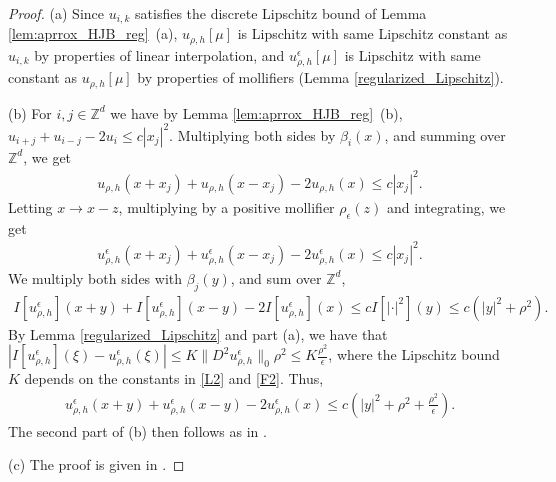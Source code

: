\documentclass[a4paper,  twoside, 10pt, leqno]{amsart}
\theoremstyle{remark}
\theoremstyle{definition}
\begin{document}
\begin{proof}
    \noindent   (a) Since $u_{i,k}$ satisfies the discrete Lipschitz bound of Lemma \ref{lem:aprrox_HJB_reg}~(a), $u_{\rho,h} [ \mu ]$ is Lipschitz with same Lipschitz constant as  $u_{i,k}$ by properties of linear interpolation, and $u_{\rho,h}^{\epsilon} [ \mu ]$ is Lipschitz with same constant as $u_{\rho,h} [ \mu ]$ by properties of mollifiers (Lemma \ref{regularized_Lipschitz}).
     
    \medskip

 \noindent (b)  For $i,j \in  \mathbb{Z}^{d}$ we have by Lemma \ref{lem:aprrox_HJB_reg}~(b),  $u_{i+j} + u_{i-j} - 2 u_{i} \leq c |x_{j}|^{2}.$
 Multiplying both sides by $\beta_{i} ( x )$, and summing over $\mathbb{Z}^{d}$, we get
 \begin{align*}
     u_{\rho,h} ( x + x_{j} ) + u_{\rho,h} ( x-x_{j} ) -2 u_{\rho,h} ( x ) \leq c |x_{j}|^{2}.
 \end{align*}
 Letting $x \to x - z$, multiplying by a positive mollifier $\rho_{\epsilon} ( z )$ and integrating, we get
 \begin{align*}
     u_{\rho,h}^{\epsilon} ( x + x_{j} ) + u_{\rho,h}^{\epsilon} ( x-x_{j} ) -2 u_{\rho,h}^{\epsilon} ( x ) \leq c |x_{j}|^{2}.
 \end{align*}
 We multiply both sides with $\beta_{j} ( y )$, and sum over $\mathbb{Z}^{d}$,
 \begin{align*}
     I [ u_{\rho,h}^{\epsilon} ] ( x+y ) + I [ u_{\rho,h}^{\epsilon} ] ( x-y ) - 2 I [ u_{\rho,h}^{\epsilon} ] ( x ) \leq c I [ |\cdot|^{2} ] ( y ) \leq  c (  |y|^{2} + \rho^{2} ).
 \end{align*}
By Lemma \ref{regularized_Lipschitz} and part (a), we have that $|I [ u_{\rho,h}^{\epsilon} ] ( \xi ) - u_{\rho,h}^{\epsilon} ( \xi )|\leq  K \| D^{2} u_{\rho,h}^{\epsilon}  \|_{0} \rho^{2} \leq  K \frac{\rho^{2}}{\epsilon}$,  where the Lipschitz bound  $K$ depends on the constants in \ref{L2} and \ref{F2}. Thus,
 \begin{align*}
      u_{\rho,h}^{\epsilon}  ( x+y ) + u_{\rho,h}^{\epsilon}  ( x-y ) - 2 u_{\rho,h}^{\epsilon}  ( x ) \leq  c (  |y|^{2} + \rho^{2} + \frac{\rho^{2}}{\epsilon} ).
 \end{align*}
 The second part of (b) then follows as in  \cite[Remark 6]{achdou2014numerical}.\medskip

 \noindent (c) The proof is given in \cite[Lemma 3.6]{carliniSilva2014semi1st}.
\end{proof}
\normalcolor
\end{document}
